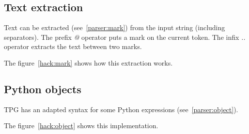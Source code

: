
\clearpage
\subsection{Text extraction}

Text can be extracted (see~\ref{parser:mark}) from the input string (including separators).
The prefix \emph{@} operator puts a mark on the current token.
The infix \emph{..} operator extracts the text between two marks.

The figure~\ref{hack:mark} shows how this extraction works.


\subsection{Python objects}

TPG has an adapted syntax for some Python expressions (see~\ref{parser:object}).

The figure~\ref{hack:object} shows this implementation.


